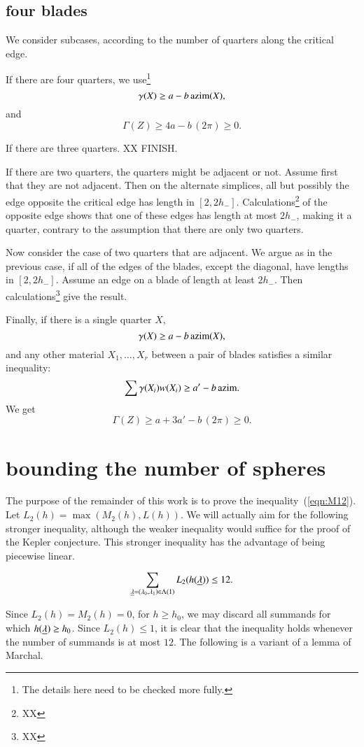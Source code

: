 \subsection{four blades}

We consider subcases, according to the number of quarters along the critical edge.

If there are four quarters, we use\footnote{The details here need to be checked more fully.}
$$
\gamma(X) \ge a - b\, {\operatorname{azim}}(X),
$$
and
$$
\Gamma(Z) \ge 4 a  - b\, (2\pi) \ge 0.
$$

If there are three quarters. XX FINISH.

If there are two quarters, the quarters might be adjacent or not.  Assume first that they are not adjacent.  Then
on the alternate simplices, all but possibly the edge
opposite the critical edge has length in $[2,2h_-]$.
Calculations\footnote{XX} of the opposite edge shows that
one of these edges has length at most $2h_-$, making it a quarter, contrary to the assumption that there are only two quarters.

Now consider the case of two quarters that are adjacent.  We argue as in the previous case, if all of the edges of the blades, except the diagonal, have lengths in $[2,2h_-]$.  Assume an edge on a blade of length at least $2h_-$.  Then calculations\footnote{XX} give the result.

Finally, if there is a single quarter $X$, 
$$
\gamma(X) \ge a - b\, {\operatorname{azim}}(X),
$$
and any other material $X_1,\ldots,X_r$
between a pair of blades
satisfies a similar inequality:
$$
\sum \gamma(X_i)w(X_i) \ge a' - b\,{\operatorname{azim}}.
$$
We get
$$
\Gamma(Z) \ge  a + 3 a' - b\, (2\pi) \ge 0.
$$

\section{bounding the number of spheres}

The purpose of the remainder of this work is to prove the inequality~(\ref{eqn:M12}).   Let $L_2(h) = \max(M_2(h),L(h))$.  We will actually aim for the 
following stronger
inequality, although the weaker inequality would suffice for the proof of the Kepler conjecture.  This stronger inequality has the advantage of being piecewise linear.

\begin{conjecture}
\begin{equation}\label{eqn:L12}
\sum_{{\underline{\lambda}}=(\lambda_0,\lambda_1)\in\Lambda(1)} L_2(h({\underline{\lambda}})) \le 12.
\end{equation}
\end{conjecture}
Since $L_2(h) = M_2(h) = 0$, for $h\ge h_0$, we may discard all summands for which $h({\underline{\lambda}})\ge h_0$.  Since $L_2(h)\le 1$, it is clear that the inequality holds whenever the number of summands is at most $12$. The following is a variant of a lemma of Marchal.


